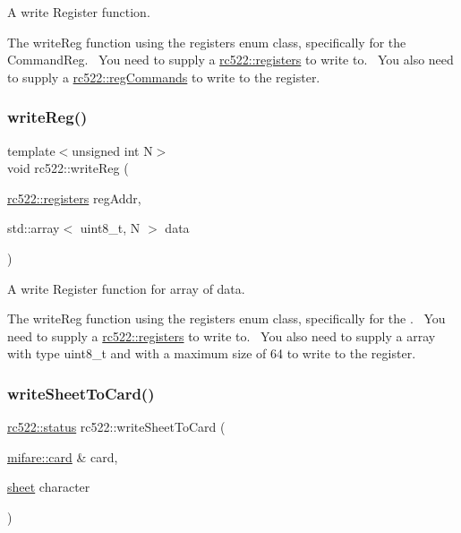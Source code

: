 A write Register function. 

The write\+Reg function using the registers enum class, specifically for the Command\+Reg.~\newline
You need to supply a \hyperlink{classrc522_a83057db5f8fefa3dc9a6e8e5f0e191ee}{rc522\+::registers} to write to.~\newline
You also need to supply a \hyperlink{classrc522_a3a205976fb9b7265bc5b7971215fbb7c}{rc522\+::reg\+Commands} to write to the register.~\newline
 \mbox{\label{classrc522_adce878aa570ff9f611df399139229265}} 
\subsubsection{\texorpdfstring{write\+Reg()}{writeReg()}\hspace{0.1cm}{\footnotesize\ttfamily [6/6]}}
{\footnotesize\ttfamily template$<$unsigned int N$>$ \\
void rc522\+::write\+Reg (\begin{DoxyParamCaption}\item[{\hyperlink{classrc522_a83057db5f8fefa3dc9a6e8e5f0e191ee}{rc522\+::registers}}]{reg\+Addr,  }\item[{std\+::array$<$ uint8\+\_\+t, N $>$}]{data }\end{DoxyParamCaption})\hspace{0.3cm}{\ttfamily [inline]}}



A write Register function for array of data. 

The write\+Reg function using the registers enum class, specifically for the .~\newline
You need to supply a \hyperlink{classrc522_a83057db5f8fefa3dc9a6e8e5f0e191ee}{rc522\+::registers} to write to.~\newline
You also need to supply a array with type uint8\+\_\+t and with a maximum size of 64 to write to the register.~\newline
 \mbox{\label{classrc522_a69f4af5f03ac07d17918880e4f9e09c3}} 
\subsubsection{\texorpdfstring{write\+Sheet\+To\+Card()}{writeSheetToCard()}}
{\footnotesize\ttfamily \hyperlink{classspiReader_a4bcf984823c38cf4841ebf619e788790}{rc522\+::status} rc522\+::write\+Sheet\+To\+Card (\begin{DoxyParamCaption}\item[{\hyperlink{classmifare_1_1card}{mifare\+::card} \&}]{card,  }\item[{\hyperlink{classsheet}{sheet}}]{character }\end{DoxyParamCaption})}



